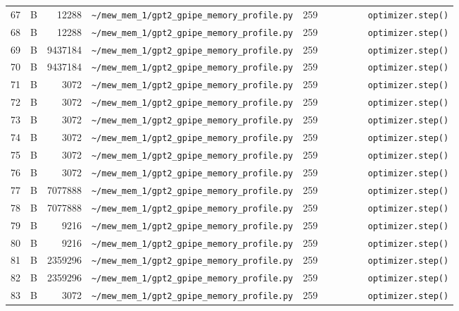 \documentclass{article}
\begin{document}
\begin{longtable}{r l r p{6.5cm} r p{7.0cm}}
67 & B & 12288 & \lstinline|~/mew_mem_1/gpt2_gpipe_memory_profile.py| & 259 & \lstinline|        optimizer.step()| \\
68 & B & 12288 & \lstinline|~/mew_mem_1/gpt2_gpipe_memory_profile.py| & 259 & \lstinline|        optimizer.step()| \\
69 & B & 9437184 & \lstinline|~/mew_mem_1/gpt2_gpipe_memory_profile.py| & 259 & \lstinline|        optimizer.step()| \\
70 & B & 9437184 & \lstinline|~/mew_mem_1/gpt2_gpipe_memory_profile.py| & 259 & \lstinline|        optimizer.step()| \\
71 & B & 3072 & \lstinline|~/mew_mem_1/gpt2_gpipe_memory_profile.py| & 259 & \lstinline|        optimizer.step()| \\
72 & B & 3072 & \lstinline|~/mew_mem_1/gpt2_gpipe_memory_profile.py| & 259 & \lstinline|        optimizer.step()| \\
73 & B & 3072 & \lstinline|~/mew_mem_1/gpt2_gpipe_memory_profile.py| & 259 & \lstinline|        optimizer.step()| \\
74 & B & 3072 & \lstinline|~/mew_mem_1/gpt2_gpipe_memory_profile.py| & 259 & \lstinline|        optimizer.step()| \\
75 & B & 3072 & \lstinline|~/mew_mem_1/gpt2_gpipe_memory_profile.py| & 259 & \lstinline|        optimizer.step()| \\
76 & B & 3072 & \lstinline|~/mew_mem_1/gpt2_gpipe_memory_profile.py| & 259 & \lstinline|        optimizer.step()| \\
77 & B & 7077888 & \lstinline|~/mew_mem_1/gpt2_gpipe_memory_profile.py| & 259 & \lstinline|        optimizer.step()| \\
78 & B & 7077888 & \lstinline|~/mew_mem_1/gpt2_gpipe_memory_profile.py| & 259 & \lstinline|        optimizer.step()| \\
79 & B & 9216 & \lstinline|~/mew_mem_1/gpt2_gpipe_memory_profile.py| & 259 & \lstinline|        optimizer.step()| \\
80 & B & 9216 & \lstinline|~/mew_mem_1/gpt2_gpipe_memory_profile.py| & 259 & \lstinline|        optimizer.step()| \\
81 & B & 2359296 & \lstinline|~/mew_mem_1/gpt2_gpipe_memory_profile.py| & 259 & \lstinline|        optimizer.step()| \\
82 & B & 2359296 & \lstinline|~/mew_mem_1/gpt2_gpipe_memory_profile.py| & 259 & \lstinline|        optimizer.step()| \\
83 & B & 3072 & \lstinline|~/mew_mem_1/gpt2_gpipe_memory_profile.py| & 259 & \lstinline|        optimizer.step()| \\

\end{longtable}
\end{document}
